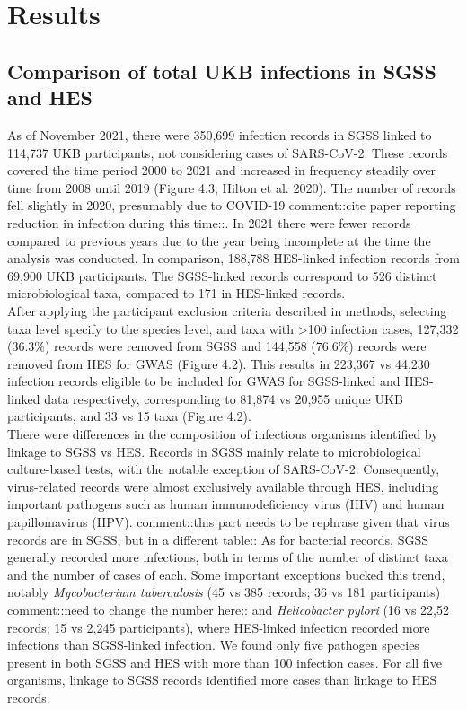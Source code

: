 \documentclass{article}
\begin{document}
\section{Results}
\subsection{Comparison of total UKB infections in SGSS and HES}
As of November 2021, there were 350,699 infection records in SGSS linked to 114,737 UKB participants, not considering cases of SARS-CoV-2. These records covered the time period 2000 to 2021 and increased in frequency steadily over time from 2008 until 2019 (Figure 4.3; Hilton et al. 2020). The number of records fell slightly in 2020, presumably due to COVID-19 comment::cite paper reporting reduction in infection during this time::. In 2021 there were fewer records compared to previous years due to the year being incomplete at the time the analysis was conducted. In comparison, 188,788 HES-linked infection records from 69,900 UKB participants. The SGSS-linked records correspond to 526 distinct microbiological taxa, compared to 171 in HES-linked records.
\\
After applying the participant exclusion criteria described in methods, selecting taxa level specify to the species level, and taxa with >100 infection cases, 127,332 (36.3\%) records were removed from SGSS and 144,558 (76.6\%) records were removed from HES for GWAS (Figure 4.2). This results in 223,367 vs 44,230 infection records eligible to be included for GWAS for SGSS-linked and HES-linked data respectively, corresponding to 81,874 vs 20,955 unique UKB participants, and 33 vs 15 taxa (Figure 4.2).
\\
There were differences in the composition of infectious organisms identified by linkage to SGSS vs HES. Records in SGSS mainly relate to microbiological culture-based tests, with the notable exception of SARS-CoV-2. Consequently, virus-related records were almost exclusively available through HES, including important pathogens such as human immunodeficiency virus (HIV) and human papillomavirus (HPV). comment::this part needs to be rephrase given that virus records are in SGSS, but in a different table:: As for bacterial records, SGSS generally recorded more infections, both in terms of the number of distinct taxa and the number of cases of each. Some important exceptions bucked this trend, notably \textit{Mycobacterium tuberculosis} (45 vs 385 records; 36 vs 181 participants) comment::need to change the number here:: and \textit{Helicobacter pylori} (16 vs 22,52 records; 15 vs 2,245 participants), where HES-linked infection recorded more infections than SGSS-linked infection. We found only five pathogen species present in both SGSS and HES with more than 100 infection cases. For all five organisms, linkage to SGSS records identified more cases than linkage to HES records.
\end{document}
